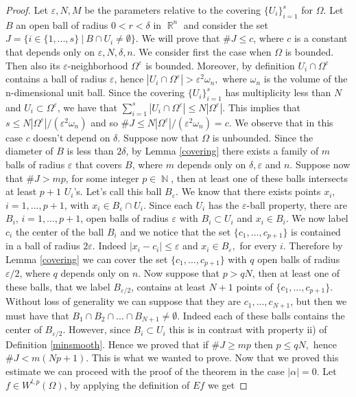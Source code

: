 \documentclass[12pt]{article}
\theoremstyle{definition}
\DeclareMathOperator\rr{\mathbb{R}}
\DeclareMathOperator\nn{\mathbb{N}}
\begin{document}
\begin{proof}
Let  $\varepsilon,N,M$ be the parameters relative to the covering $\{ U_i\}_{i=1}^s$ for $\Omega$. Let $B$ an open ball of radius $0<r<\delta$ in $\rr^n$ and consider the set $J=\{i \in \{1,...,s\} \ | \ B\cap U_i \neq \emptyset\}$. We will prove that $\#J\le c$, where $c$ is a constant that depends only on $\varepsilon,N,\delta,n.$ We consider first the case when $\Omega$ is bounded. Then also its $\varepsilon$-neighborhood $\Omega^\varepsilon $ is bounded. Moreover, by definition $U_i\cap \Omega^\varepsilon$ contains a ball of radius $\varepsilon$, hence $|U_i\cap \Omega^\varepsilon|>\varepsilon^2\omega_n,$ where $\omega_n$ is the volume of the n-dimensional unit ball. Since the covering $\{U_i\}_{i=1}^s$ has multiplicity less than $N$ and $U_i\subset\Omega^\varepsilon$, we have that $\sum_{i=1}^s|U_i\cap \Omega^\varepsilon|\le N |\Omega^\varepsilon|$. This implies that $s\le N |\Omega^\varepsilon|/(\varepsilon^2\omega_n)$ and so $\#J\le N |\Omega^\varepsilon|/(\varepsilon^2\omega_n)=c.$ We observe that in this case $c$ doesn't depend on $\delta.$ Suppose now that $\Omega$ is unbounded. Since the diameter of $B$ is less than $2\delta$, by Lemma \ref{covering} there exists a family of $m$ balls of radius $\varepsilon$ that covers $B$, where $m$ depends only on $\delta,\varepsilon$ and $n$. Suppose now that $\#J>mp$, for some integer $p\in \nn$, then at least one of these balls intersects at least $p+1$  $U_i$'s. Let's call this ball $B_\varepsilon.$ We know that there exists points $x_i$, $i=1,...,p+1$, with $x_i \in B_\varepsilon \cap U_i.$ Since each $U_i$ has the $\varepsilon$-ball property, there are $B_i$, $i=1,...,p+1$, open balls of radius $\varepsilon$ with $B_i \subset U_i$ and $x_i \in B_i.$ We now label $c_i$ the center of the ball $B_i$ and we notice that the set $\{c_1,...,c_{p+1}\}$ is contained in a ball of radius $2\varepsilon.$ Indeed $|x_i-c_i|\le \varepsilon$ and $x_i \in B_\varepsilon,$ for every $i.$ Therefore by Lemma \ref{covering} we can cover the set $\{c_1,...,c_{p+1}\}$ with $q$ open balls of radius $\varepsilon/2$, where $q$ depends only on $n.$ Now suppose that $p>qN$, then at least one of these balls, that we label $B_{\varepsilon/2}$, contains at least $N+1$ points of $\{c_1,...,c_{p+1}\}.$ Without loss of generality we can suppose that they are $c_1,...,c_{N+1}$, but then we must have that $B_1\cap B_2 \cap ... \cap B_{N+1}\neq \emptyset$. Indeed each of these balls contains the center of $B_{\varepsilon/2}.$ However, since $B_i \subset U_i$ this is in contrast with property ii) of Definition \ref{minsmooth}. Hence we proved that if $\#J\ge mp$ then $p\le qN,$ hence $\#J<m(Np+1) $. This is what we wanted to prove. Now that we proved this estimate we can proceed with the proof of the theorem in the case $|\alpha|=0.$ Let $f \in W^{l,p}(\Omega)$, by applying the definition of $Ef$ we get


\end{proof}
\end{document}
